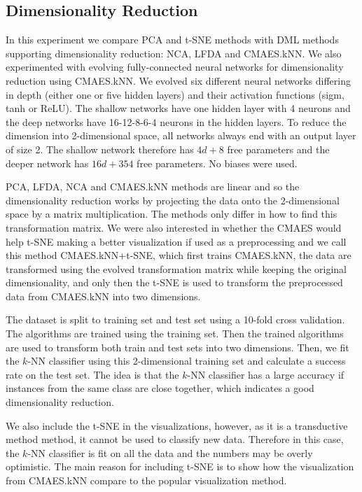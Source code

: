 \subsection{Dimensionality Reduction}
\label{chap:exp:dimred}

In this experiment we compare PCA and t-SNE methods with DML methods supporting dimensionality reduction: NCA, LFDA and CMAES.kNN. We also experimented with evolving fully-connected neural networks for dimensionality reduction using CMAES.kNN. We evolved six different neural networks differing in depth (either one or five hidden layers) and their activation functions (sigm, tanh or ReLU). The shallow networks have one hidden layer with 4 neurons and the deep networks have 16-12-8-6-4 neurons in the hidden layers. To reduce the dimension into 2-dimensional space, all networks always end with an output layer of size 2. The shallow network therefore has $4d+8$ free parameters and the deeper network has $16d+354$ free parameters. No biases were used.

PCA, LFDA, NCA and CMAES.kNN methods are linear and so the dimensionality reduction works by projecting the data onto the 2-dimensional space by a matrix multiplication. The methods only differ in how to find this transformation matrix. We were also interested in whether the CMAES would help t-SNE making a better visualization if used as a preprocessing and we call this method CMAES.kNN+t-SNE, which first trains CMAES.kNN, the data are transformed using the evolved transformation matrix while keeping the original dimensionality, and only then the t-SNE is used to transform the preprocessed data from CMAES.kNN into two dimensions.

The dataset is split to training set and test set using a 10-fold cross validation. The algorithms are trained using the training set. Then the trained algorithms are used to transform both train and test sets into two dimensions. Then, we fit the $k$-NN classifier using this 2-dimensional training set and calculate a success rate on the test set. The idea is that the $k$-NN classifier has a large accuracy if instances from the same class are close together, which indicates a good dimensionality reduction.

We also include the t-SNE in the visualizations, however, as it is a transductive method method, it cannot be used to classify new data. Therefore in this case, the $k$-NN classifier is fit on all the data and the numbers may be overly optimistic. The main reason for including t-SNE is to show how the visualization from CMAES.kNN compare to the popular visualization method.

